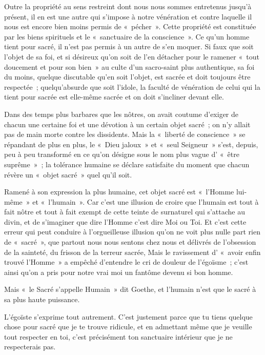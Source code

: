 \documentclass[french,twoside]{book} %
\begin{document}
Outre la propriété au sens restreint dont nous nous sommes entretenus jusqu’à présent, il en est une autre qui s’impose à notre vénération et contre laquelle il nous est encore bien moins permis de « pécher ». Cette propriété est constituée par les biens spirituels et le « sanctuaire de la conscience ». Ce qu’un homme tient pour sacré, il n’est pas permis à un autre de s’en moquer. Si faux que soit l’objet de sa foi, et si désireux qu’on soit de l’en détacher pour le ramener « tout doucement et pour son bien » au culte d’un sacro-saint plus authentique, sa foi du moins, quelque discutable qu’en soit l’objet, est sacrée et doit toujours être respectée ; quelqu’absurde que soit l’idole, la faculté de vénération de celui qui la  tient pour sacrée est elle-même sacrée et on doit s’incliner devant elle.\par
Dans des temps plus barbares que les nôtres, on avait coutume d’exiger de chacun une certaine foi et une dévotion à un certain objet sacré ; on n’y allait pas de main morte contre les dissidents. Mais la « liberté de conscience » se répandant de plus en plus, le « Dieu jaloux » et « seul Seigneur » s’est, depuis, peu à peu transformé en ce qu’on désigne sous le nom plus vague d’ « être suprême » ; la tolérance humaine se déclare satisfaite du moment que chacun révère un « objet sacré » quel qu’il soit.\par
Ramené à son expression la plus humaine, cet objet sacré est « l’Homme lui-même » et « l’humain ». Car c’est une illusion de croire que l’humain est tout à fait nôtre et tout à fait exempt de cette teinte de surnaturel qui s’attache au divin, et de s’imaginer que dire l’Homme c’est dire Moi ou Toi. Et c’est cette erreur qui peut conduire à l’orgueilleuse illusion qu’on ne voit plus nulle part rien de « sacré », que partout nous nous sentons chez nous et délivrés de l’obsession de la sainteté, du frisson de la terreur sacrée, Mais le ravissement d’ « avoir enfin trouvé l’Homme » a empêché d’entendre le cri de douleur de l’égoïsme ; c’est ainsi qu’on a pris pour notre vrai moi un fantôme devenu si bon homme.\par
Mais « le Sacré s’appelle Humain » dit Goethe, et l’humain n’est que le sacré à sa plus haute puissance.\par
L’égoïste s’exprime tout autrement. C’est justement parce que tu tiens quelque chose pour sacré que je te trouve ridicule, et en admettant même que je veuille tout respecter en toi, c’est précisément ton sanctuaire intérieur que je ne respecterais pas.\par
\end{document}

